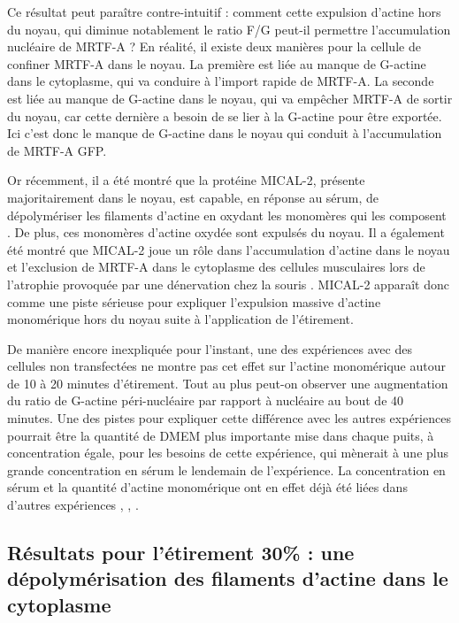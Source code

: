 Ce résultat peut paraître contre-intuitif : comment cette expulsion d'actine hors du noyau, qui diminue notablement le ratio F/G peut-il permettre l'accumulation nucléaire de MRTF-A ? En réalité, il existe deux manières pour la cellule de confiner MRTF-A dans le noyau. La première est liée au manque de G-actine dans le cytoplasme, qui va conduire à l'import rapide de MRTF-A. La seconde est liée au manque de G-actine dans le noyau, qui va empêcher MRTF-A de sortir du noyau, car cette dernière a besoin de se lier à la G-actine pour être exportée. Ici c'est donc le manque de G-actine dans le noyau qui conduit à l'accumulation de MRTF-A GFP. 

Or récemment, il a été montré que la protéine MICAL-2, présente majoritairement dans le noyau, est capable, en réponse au sérum, de dépolymériser les filaments d'actine en oxydant les monomères qui les composent \parencite{lundquist_redox_2014}. De plus, ces monomères d'actine oxydée sont expulsés du noyau. Il a également été montré que MICAL-2 joue un rôle dans l'accumulation d'actine dans le noyau et l'exclusion de MRTF-A dans le cytoplasme des cellules musculaires lors de l'atrophie provoquée par une dénervation chez la souris \parencite{collard_nuclear_2014}. MICAL-2 apparaît donc comme une piste sérieuse pour expliquer l'expulsion massive d'actine monomérique hors du noyau suite à l'application de l'étirement. 

De manière encore inexpliquée pour l'instant, une des expériences avec des cellules non transfectées ne montre pas cet effet sur l'actine monomérique autour de 10 à 20 minutes d'étirement. Tout au plus peut-on observer une augmentation du ratio de G-actine péri-nucléaire par rapport à nucléaire au bout de 40 minutes. Une des pistes pour expliquer cette différence avec les autres expériences pourrait être la quantité de DMEM plus importante mise dans chaque puits, à concentration égale, pour les besoins de cette expérience, qui mènerait à une plus grande concentration en sérum le lendemain de l'expérience. La concentration en sérum et la quantité d'actine monomérique ont en effet déjà été liées dans d'autres expériences \cite{mouilleron_molecular_2008}, \cite{vartiainen_nuclear_2007}, \cite{lundquist_redox_2014}.  



\subsection{Résultats pour l'étirement 30\% : une dépolymérisation des filaments d'actine dans le cytoplasme}

